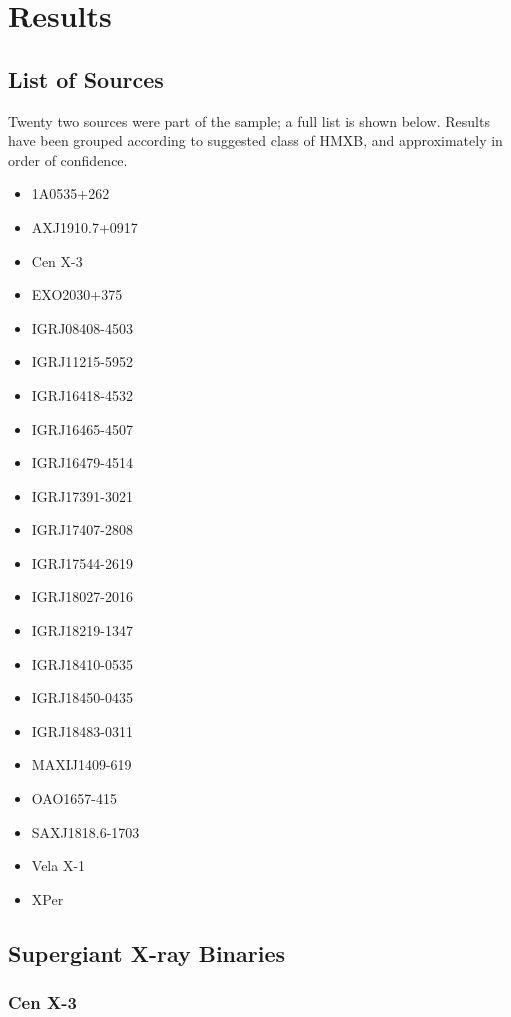 
\chapter{Results} %

\label{ch:results} %

\section{List of Sources}
Twenty two sources were part of the sample; a full list is shown below. Results have been grouped according to suggested class of HMXB, and approximately in order of confidence.
\begin{itemize}
\item 1A0535+262
\item AXJ1910.7+0917
\item Cen X-3
\item EXO2030+375
\item IGRJ08408-4503
\item IGRJ11215-5952
\item IGRJ16418-4532
\item IGRJ16465-4507
\item IGRJ16479-4514
\item IGRJ17391-3021
\item IGRJ17407-2808
\item IGRJ17544-2619
\item IGRJ18027-2016
\item IGRJ18219-1347
\item IGRJ18410-0535
\item IGRJ18450-0435
\item IGRJ18483-0311
\item MAXIJ1409-619
\item OAO1657-415
\item SAXJ1818.6-1703
\item Vela X-1
\item XPer
\end{itemize}
\clearpage{}

\section{Supergiant X-ray Binaries}
\subsection{Cen X-3}

